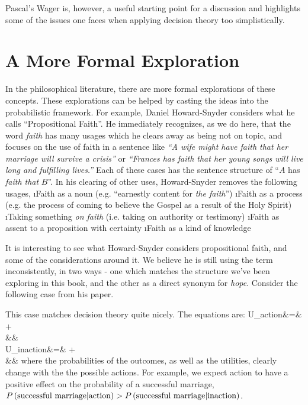 Pascal's Wager is, however, a useful starting point for a discussion and highlights some of the issues one faces when applying decision theory too simplistically. 

\section{A More Formal Exploration}

In the philosophical literature, there are more formal explorations of these concepts.  These explorations can be helped by casting the ideas into the probabilistic framework.  For example, Daniel Howard-Snyder considers what he calls ``Propositional Faith''\cite{howard2013propositional}.  He immediately recognizes, as we do here, that the word {\em faith} has many usages which he clears away as being not on topic, and focuses on the use of faith in a sentence like {\em ``A wife might have faith that her marriage will survive a crisis''} or {\em ``Frances has faith that her young songs will live long and fulfilling lives.''}  Each of these cases has the sentence structure of ``$A$ has {\em faith that} $B$''.  In his clearing of other uses, Howard-Snyder removes the following usages,
\bi
\i Faith as a noun (e.g. ``earnestly content for {\em the faith}'')
\i Faith as a process (e.g. the process of coming to believe the Gospel as a result of the Holy Spirit)
\i Taking something {\em on faith} (i.e. taking on authority or testimony)
\i Faith as assent to a proposition with certainty
\i Faith as a kind of knowledge
\ei

It is interesting to see what Howard-Snyder considers propositional faith, and some of the considerations around it.  We believe he is still using the term inconsistently, in two ways - one which matches the structure we've been exploring in this book, and the other as a direct synonym for {\em hope}.  Consider the following case from his paper.

This case matches decision theory quite nicely. The equations are:
\beqn
\langle U_{\mbox{action}}\rangle &=& \times {} + \\
&& \times {} \\
\langle U_{\mbox{inaction}}\rangle &=& \times {} + \\
&& \times {}
\eeqn
where the probabilities of the outcomes, as well as the utilities, clearly change with the the possible actions.  For example, we expect action to have a positive effect on the probability of a successful marriage, $P\left(\mbox{successful marriage}|\mbox{action}\right)>P\left(\mbox{successful marriage}|\mbox{inaction}\right)$.


